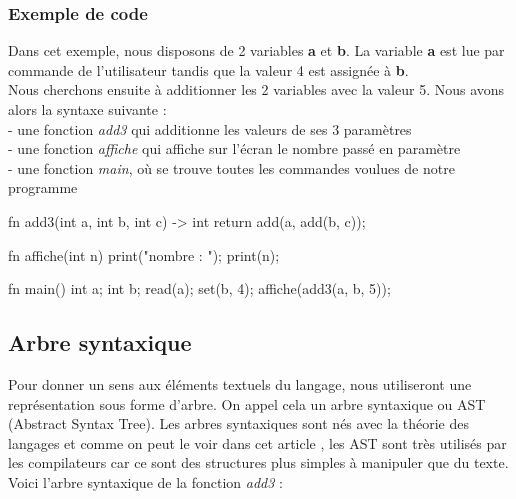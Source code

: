 \documentclass[a4paper]{article}%
\begin{document}
\subsubsection{Exemple de code}

Dans cet exemple, nous disposons de 2 variables \textbf{a} et \textbf{b}. La
variable \textbf{a} est lue par commande de l'utilisateur tandis que la valeur 4
est assignée à \textbf{b}.\\
Nous cherchons ensuite à additionner les 2 variables avec la valeur 5. Nous avons alors la syntaxe suivante :\\
- une fonction \textit{add3} qui additionne les valeurs de ses 3 paramètres\\
- une fonction \textit{affiche} qui affiche sur l'écran le nombre passé en paramètre\\
- une fonction \textit{main}, où se trouve toutes les commandes voulues de notre programme\\



\begin{grammar}[language=C++]
fn add3(int a, int b, int c) -> int {
    return add(a, add(b, c));
}

fn affiche(int n) {
    print("nombre : ");
    print(n);
}

fn main() {
    int a;
    int b;
    read(a);
    set(b, 4);
    affiche(add3(a, b, 5));
}
\end{grammar}\leavevmode\newline


\clearpage{}
\subsection{Arbre syntaxique}%

Pour donner un sens aux éléments textuels du langage, nous utiliseront une
représentation sous forme d'arbre. On appel cela un arbre syntaxique ou AST
(Abstract Syntax Tree). Les arbres syntaxiques sont nés avec la théorie des
langages et comme on peut le voir dans cet article \cite{compilerTICH}, les AST
sont très utilisés par les compilateurs car ce sont des structures plus simples
à manipuler que du texte. Voici l'arbre syntaxique de la fonction \textit{add3} :
\end{document}
